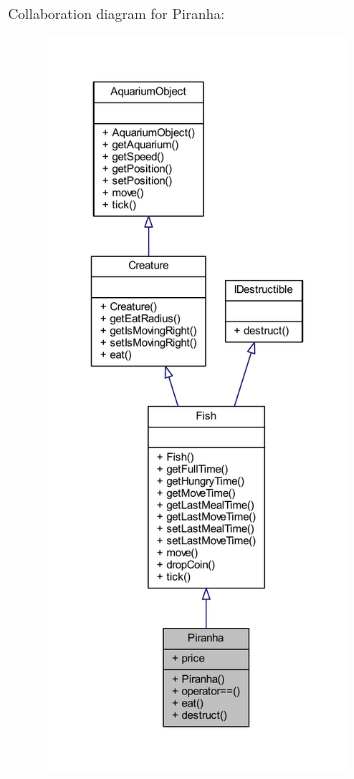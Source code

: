 Collaboration diagram for Piranha\+:\nopagebreak
\begin{figure}[H]
\begin{center}
\leavevmode
\includegraphics[height=550pt]{class_piranha__coll__graph}
\end{center}
\end{figure}
